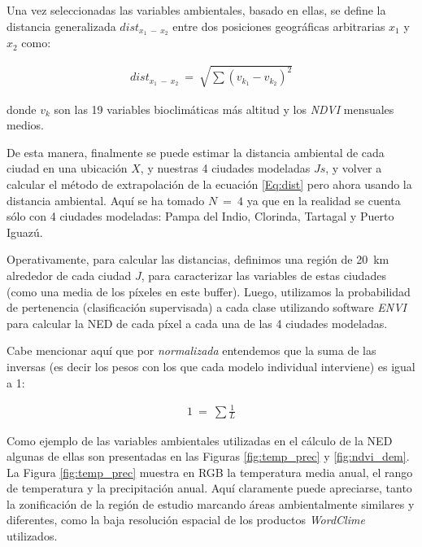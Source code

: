   \par Una vez seleccionadas las variables ambientales, basado en ellas, se
    define la distancia generalizada $dist_{x_{1}\ -\ x_{2}}$ entre dos
    posiciones geográficas arbitrarias $x_{1}$ y $x_{2}$ como:

    \begin{align}
      dist_{x_{1}\ -\ x_{2}} \ =\ \sqrt{\sum{}{(v_{k_{1}} - v_{k_{2}})^{2}}}
    \end{align}

    donde $v_{k}$ son las 19 variables bioclimáticas más altitud y los
    \textit{NDVI} mensuales medios.

  \par De esta manera, finalmente se puede estimar la distancia ambiental de
    cada ciudad en una ubicación $X$, y nuestras 4 ciudades modeladas
    $Js$, y volver a calcular el método de extrapolación de la ecuación \ref{Eq:dist}
    pero ahora usando la distancia ambiental. Aquí se ha tomado $N\ =\ 4$ ya
    que en la realidad se cuenta sólo con 4 ciudades modeladas:
    Pampa del Indio, Clorinda, Tartagal y Puerto Iguazú.


  \par Operativamente, para calcular las distancias, definimos una región de
    \SI{20}{\kilo\meter} alrededor de cada ciudad $J$, para caracterizar las
    variables de estas ciudades (como una media de los píxeles en este buffer).
    Luego, utilizamos la probabilidad de pertenencia (clasificación supervisada)
    a cada clase utilizando software \textit{ENVI} para calcular la NED de cada píxel
    a cada una de las 4 ciudades modeladas.

  \par Cabe mencionar aquí que por \textit{normalizada} entendemos que la
    suma de las inversas (es decir los pesos con los que cada modelo
    individual interviene) es igual a 1:

  \begin{align}
    1\ =\ \sum{}{\frac{1}{L}}
  \end{align}


  \par Como ejemplo de las variables ambientales utilizadas en el cálculo de
    la NED algunas de ellas son presentadas en las Figuras \ref{fig:temp_prec}
    y \ref{fig:ndvi_dem}.
    La Figura \ref{fig:temp_prec} muestra en RGB la temperatura media anual,
    el rango de temperatura y la precipitación anual. Aquí claramente puede
    apreciarse, tanto la zonificación de la región de estudio marcando áreas
    ambientalmente similares y diferentes, como la baja resolución espacial
    de los productos \textit{WordClime} utilizados.

